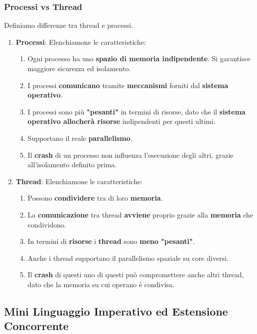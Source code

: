 \documentclass{article}
\begin{document}
\newpage

\subsubsection{Processi vs Thread}
Definiamo differenze tra thread e processi.

\begin{enumerate}
    \item \textbf{Processi}: Elenchiamone le caratteristiche:
        \begin{enumerate}
            \item Ogni processo ha uno \textbf{spazio di memoria indipendente}. Si garantisce maggiore sicurezza ed isolamento.
            \item I processi \textbf{comunicano} tramite \textbf{meccanismi} forniti dal \textbf{sistema operativo}.
            \item I processi sono più \textbf{"pesanti"} in termini di risorse, dato che il \textbf{sistema operativo allocherà risorse} indipendenti per questi ultimi.
            \item Supportano il reale \textbf{parallelismo}.
            \item Il \textbf{crash} di un processo non influenza l'esecuzione degli altri, grazie all'isolamento definito prima.
        \end{enumerate}
    \item \textbf{Thread}: Elenchiamone le caratteristiche:
        \begin{enumerate}
            \item Possono \textbf{condividere} tra di loro \textbf{memoria}.
            \item La \textbf{comunicazione} tra thread \textbf{avviene} proprio grazie alla \textbf{memoria} che condividono.
            \item In termini di \textbf{risorse} i \textbf{thread} sono \textbf{meno "pesanti"}.
            \item Anche i thread supportano il parallelismo spaziale su core diversi.
            \item Il \textbf{crash} di questi uno di questi può compromettere anche altri thread, dato che la memoria su cui operano è condivisa.
        \end{enumerate}
\end{enumerate}

\subsection{Mini Linguaggio Imperativo ed Estensione Concorrente}
\end{document}
